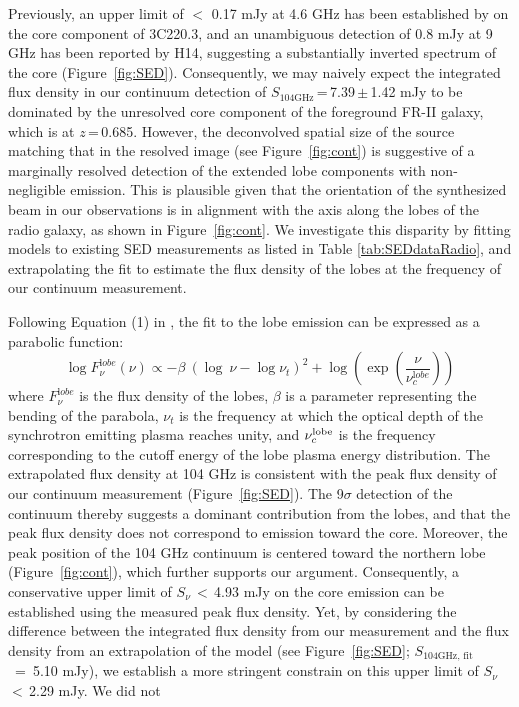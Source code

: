 \documentclass[iop]{emulateapj}
\begin{document}
Previously,  an upper
limit of $<$ 0.17 mJy at 4.6 GHz has been established by \citet{Mullin06a} on the core component of 3C220.3, and an unambiguous detection of 0.8 mJy at 9 GHz has been reported by H14, suggesting a substantially inverted spectrum of the core (Figure~\ref{fig:SED}).
Consequently, we may naively expect the integrated flux density in our continuum detection of $S_\textrm{104GHz}$\,=\,7.39\,$\pm$\,1.42\,\,mJy to be dominated by the unresolved core component of the foreground FR-II galaxy, which is at $z$\,=\,0.685.
However, the deconvolved spatial size of the source matching that in the resolved image (see Figure~\ref{fig:cont}) is
suggestive of a marginally resolved detection of the extended lobe components with non-negligible emission.
This is plausible given that the orientation of the synthesized beam in our observations is in alignment with the
axis along the
lobes of the radio galaxy, as shown in Figure~\ref{fig:cont}. We investigate this disparity by fitting models to
existing SED measurements as listed in Table \ref{tab:SEDdataRadio}, and extrapolating the fit to
estimate the flux density of the lobes at the frequency of our continuum measurement.

Following Equation (1) in \citet{Cleary07a}, the fit to the lobe emission can be expressed as a parabolic function:
\begin{equation}
\log F_{\nu}^{\mathrm lobe} (\nu) \propto - \beta\ (\log\ \nu - \log \nu_{t})^2  + \log (\exp({\frac{\nu}{\nu_c^{\mathrm lobe}}}))
\end{equation}
where $F_{\nu}^{\mathrm lobe}$ is the flux density of the lobes, $\beta$ is a parameter representing the bending
of the parabola, $\nu_t$ is the frequency at which the optical depth of the synchrotron emitting plasma reaches
unity, and $\nu_c^{\rm lobe}$ is the frequency corresponding to the cutoff energy of the lobe plasma energy
distribution. 
The extrapolated flux density at 104\,\,GHz is consistent with the peak flux density of our continuum
measurement (Figure~\ref{fig:SED}). The 9$\sigma$ detection of the continuum thereby suggests a
dominant contribution from the lobes, and that the peak flux density does not correspond to emission toward
the core. Moreover, the peak position of the 104\,\,GHz continuum is
centered toward the northern lobe (Figure~\ref{fig:cont}), which further supports our argument. 
Consequently, a conservative upper limit of $S_\nu$\,$<$\,4.93 mJy on the core emission can be established using the measured peak flux density. Yet, by considering the 
difference between the integrated flux density from our measurement and the flux density from an extrapolation of the model (see Figure~\ref{fig:SED}; $S_\textrm{104GHz, fit}$~=~5.10 mJy), we establish a more stringent constrain on this upper limit of $S_\nu$\,$<$\,2.29 mJy. We did not 
\end{document}

